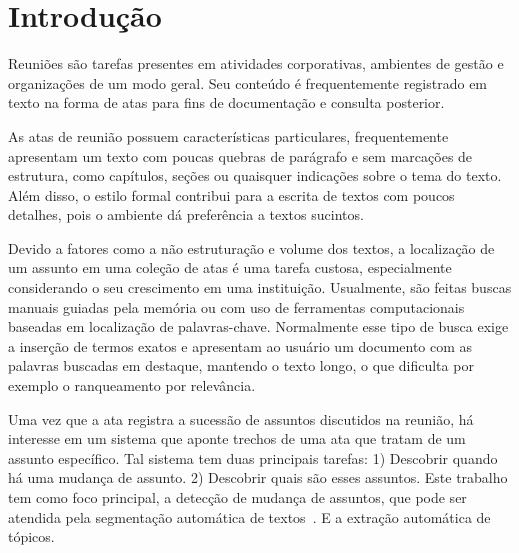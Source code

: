 \chapter{Introdução}\label{chap:introducao}




Reuniões são tarefas presentes em atividades corporativas, ambientes de gestão e organizações de um modo geral. Seu conteúdo é frequentemente registrado em texto na forma de atas para fins de documentação e consulta posterior. 




As atas de reunião possuem características particulares, frequentemente apresentam um texto com poucas quebras de parágrafo e sem marcações de estrutura, como capítulos, seções ou quaisquer indicações sobre o tema do texto. Além disso, o estilo formal contribui para a escrita de textos com poucos detalhes, pois o ambiente dá preferência a textos sucintos. 



Devido a fatores como a não estruturação e volume dos textos, a localização de um assunto em uma coleção de atas é uma tarefa custosa, especialmente considerando o seu crescimento em uma instituição.  Usualmente, são feitas buscas manuais guiadas pela memória ou com uso de ferramentas computacionais baseadas em localização de palavras-chave.  Normalmente esse tipo de busca exige a inserção de termos exatos e 
apresentam ao usuário um documento com as palavras buscadas em destaque, mantendo o texto longo, o que dificulta por exemplo o ranqueamento por relevância. 







Uma vez que a ata registra a sucessão de assuntos discutidos na reunião, há interesse em um sistema que aponte trechos de uma ata que tratam de um assunto específico. Tal sistema tem duas principais tarefas: 1) Descobrir quando há uma mudança de assunto. 2) Descobrir quais são esses assuntos. Este trabalho tem como foco principal, a detecção de mudança de assuntos, que pode ser atendida pela segmentação automática de textos~\cite{Chen2017,Naili2016,Cardoso2017}. E a extração automática de tópicos. 

